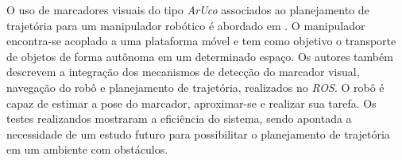 O uso de marcadores visuais do tipo \textit{ArUco} associados ao planejamento de trajetória para um manipulador robótico é abordado em \cite{javeed2019autonomous}. O manipulador encontra-se acoplado a uma plataforma móvel e tem como objetivo o transporte de objetos de forma autônoma em um determinado espaço. Os autores também descrevem a integração dos mecanismos de detecção do marcador visual, navegação do robô e planejamento de trajetória, realizados no \textit{\acs{ROS}}. O robô é capaz de estimar a pose do marcador, aproximar-se e realizar sua tarefa. Os testes realizandos mostraram a eficiência do sistema, sendo apontada a necessidade de um estudo futuro para possibilitar o planejamento de trajetória em um ambiente com obstáculos.





